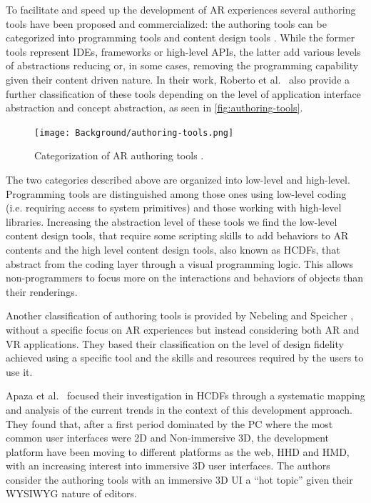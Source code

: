 To facilitate and speed up the development of AR experiences several authoring tools have been proposed and commercialized: the authoring tools can be categorized into programming tools and content design tools \cite{marcus_authoring_2016}. While the former tools represent IDEs, frameworks or high-level APIs, the latter add various levels of abstractions reducing or, in some cases, removing the programming capability given their content driven nature.
In their work, Roberto et al.~\cite{marcus_authoring_2016} also provide a further classification of these tools depending on the level of application interface abstraction and concept abstraction, as seen in \autoref{fig:authoring-tools}.
\begin{figure}[h]
	\centering
	\texttt{[image: Background/authoring-tools.png]}
	\caption{Categorization of AR authoring tools \cite{marcus_authoring_2016}.}
	\label{fig:authoring-tools}
\end{figure}
The two categories described above are organized into low-level and high-level. Programming tools are distinguished among those ones using low-level coding (i.e. requiring access to system primitives) and those working with high-level libraries.
Increasing the abstraction level of these tools we find the low-level content design tools, that require some scripting skills to add behaviors to AR contents and the high level content design tools, also known as \glspl{HCDF}, that abstract from the coding layer through a visual programming logic. This allows non-programmers to focus more on the interactions and behaviors of objects than their renderings.

Another classification of authoring tools is provided by Nebeling and Speicher \cite{nebeling_trouble_2018}, without a specific focus on AR experiences but instead considering both AR and VR applications. They based their classification on the level of design fidelity achieved using a specific tool and the skills and resources required by the users to use it.

Apaza et al.~\cite{apaza_systematic_2018} focused their investigation in \glspl{HCDF} through a systematic mapping and analysis of the current trends in the context of this development approach. 
They found that, after a first period dominated by the PC where the most common user interfaces were 2D and Non-immersive 3D, the development platform have been moving to different platforms as the web, \gls{HHD} and \gls{HMD}, with an increasing interest into immersive 3D user interfaces. The authors consider the authoring tools with an immersive 3D UI a “hot topic” given their WYSIWYG nature of editors.


